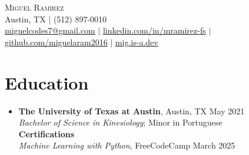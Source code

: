 \documentclass[letterpaper,10pt]{article}
\begin{document}
\begin{center}
  {\Huge \scshape Miguel Ramirez} \\ \vspace{1pt}
  Austin, TX | (512) 897-0010 \\ 
  \href{mailto:miguelcodes7@gmail.com}{miguelcodes7@gmail.com} $|$
  \href{https://linkedin.com/in/mramirez-fs}{linkedin.com/in/mramirez-fs} $|$
  \href{https://github.com/miguelaram2016}{github.com/miguelaram2016} $|$
  \href{https://mig.is-a.dev}{mig.is-a.dev}
\end{center}

\section*{Education}
\begin{itemize}[leftmargin=0.15in]
  \item[]
    \textbf{The University of Texas at Austin}, Austin, TX \hfill May 2021 \\
    \textit{Bachelor of Science in Kinesiology}; Minor in Portuguese \\
    \textbf{Certifications} \\
    \textit{Machine Learning with Python}, FreeCodeCamp \hfill March 2025 
\end{itemize}

\end{document}
